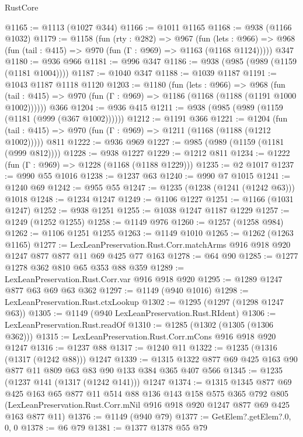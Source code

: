 \begin{lexlean}{RustCore}
\begin{coremodule}
@1165 := @1113 (@1027 @344)
@1166 := @1011 @1165
@1168 := @938 (@1166 @1032)
@1179 := @1158
    (fun (rty : @282) =>
    @967
      (fun (lets : @966) =>
      @968 (fun (tail : @415) => @970 (fun (Γ : @969) => @1163 (@1168 @1124)))))
    @347
@1180 := @936 @966
@1181 := @996 @347
@1186 := @938 (@985 (@989 (@1159 (@1181 @1004))))
@1187 := @1040 @347
@1188 := @1039 @1187
@1191 := @1043 @1187 @1118 @1120
@1203 := @1180
    (fun (lets : @966) =>
    @968 (fun (tail : @415) => @970 (fun (Γ : @969) => @1186 (@1168 (@1188 (@1191 @1000 @1002))))))
    @366
@1204 := @936 @415
@1211 := @938 (@985 (@989 (@1159 (@1181 (@999 (@367 @1002))))))
@1212 := @1191 @366
@1221 := @1204
    (fun (tail : @415) => @970 (fun (Γ : @969) => @1211 (@1168 (@1188 (@1212 @1002)))))
    @811
@1222 := @936 @969
@1227 := @985 (@989 (@1159 (@1181 (@999 @812))))
@1228 := @938 @1227
@1229 := @1212 @811
@1234 := @1222 (fun (Γ : @969) => @1228 (@1168 (@1188 @1229)))
@1235 := @2 @1017
@1237 := @990 @55 @1016
@1238 := @1237 @63
@1240 := @990 @7 @1015
@1241 := @1240 @69
@1242 := @955 @55
@1247 := @1235 (@1238 (@1241 (@1242 @63))) @1018
@1248 := @1234 @1247
@1249 := @1106 @1227
@1251 := @1166 (@1031 @1247)
@1252 := @938 @1251
@1255 := @1038 @1247 @1187 @1229
@1257 := @1249 (@1252 @1255)
@1258 := @1149 @976
@1260 := @1257 (@1258 @984)
@1262 := @1106 @1251 @1255
@1263 := @1149 @1010
@1265 := @1262 (@1263 @1165)
@1277 := LexLeanPreservation.Rust.Corr.matchArms
    @916
    @918
    @920
    @1247
    @877
    @877
    @11
    @69
    @425
    @77
    @163
@1278 := @64 @90
@1285 := @1277 @1278 @362 @810 @65 @353 @88 @359
@1289 := LexLeanPreservation.Rust.Corr.var @916 @918 @920
@1295 := @1289 @1247 @877 @63 @69 @63 @362
@1297 := @1149 (@940 @1016)
@1298 := LexLeanPreservation.Rust.ctxLookup
@1302 := @1295 (@1297 (@1298 @1247 @63))
@1305 := @1149 (@940 LexLeanPreservation.Rust.RIdent)
@1306 := LexLeanPreservation.Rust.readOf
@1310 := @1285 (@1302 (@1305 (@1306 @362)))
@1315 := LexLeanPreservation.Rust.Corr.mCons @916 @918 @920 @1247
@1316 := @1237 @88
@1317 := @1240 @11
@1322 := @1235 (@1316 (@1317 (@1242 @88))) @1247
@1339 := @1315 @1322 @877 @69 @425 @163 @90 @877 @11 @809 @63 @83 @90 @133 @384 @365 @407 @566
@1345 := @1235 (@1237 @141 (@1317 (@1242 @141))) @1247
@1374 := @1315
    @1345
    @877
    @69
    @425
    @163
    @65
    @877
    @11
    @514
    @88
    @136
    @143
    @158
    @575
    @365
    @792
    @805
    (LexLeanPreservation.Rust.Corr.mNil @916 @918 @920 @1247 @877 @69 @425 @163 @877 @11)
@1376 := @1149 (@940 @79)
@1377 := GetElem?.getElem?.{0, 0, 0}
@1378 := @6 @79
@1381 := @1377 @1378 @55 @79

\end{coremodule}
\end{lexlean}
